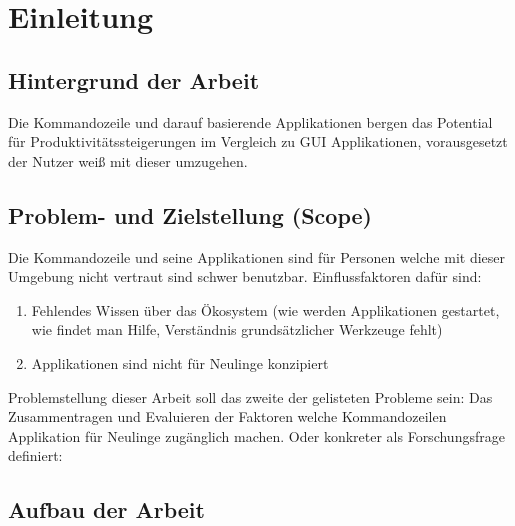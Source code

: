 \documentclass[oneside,bibliography=totocnumbered,BCOR=5mm]{scrbook}
\begin{document}
\chapter{Einleitung}
\section{Hintergrund der Arbeit}

Die Kommandozeile und darauf basierende Applikationen bergen das Potential für Produktivitätssteigerungen im Vergleich zu GUI Applikationen, vorausgesetzt der Nutzer weiß mit dieser umzugehen. %


\section{Problem- und Zielstellung (Scope)}

Die Kommandozeile und seine Applikationen sind für Personen welche mit dieser Umgebung nicht vertraut sind schwer benutzbar. %
Einflussfaktoren dafür sind:

\begin{enumerate}
  \item Fehlendes Wissen über das Ökosystem (wie werden Applikationen gestartet, wie findet man Hilfe, Verständnis grundsätzlicher Werkzeuge fehlt)
  \item Applikationen sind nicht für Neulinge konzipiert
\end{enumerate}

Problemstellung dieser Arbeit soll das zweite der gelisteten Probleme sein: Das Zusammentragen und Evaluieren der Faktoren welche Kommandozeilen Applikation für Neulinge zugänglich machen. Oder konkreter als Forschungsfrage definiert:

\bigbreak


\section{Aufbau der Arbeit}
\end{document}

